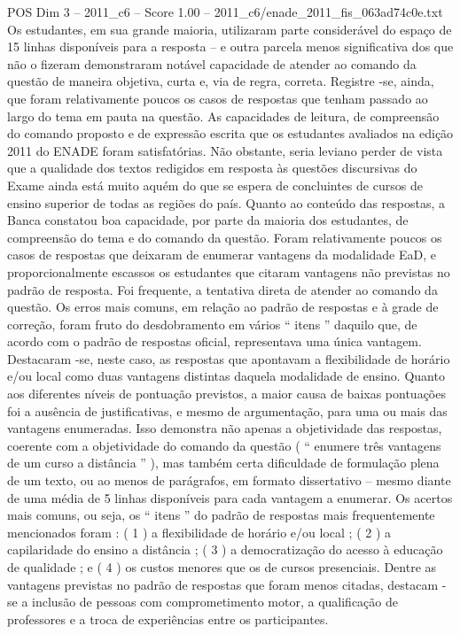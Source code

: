 \begin{textsample}{POS Dim 3 – 2011\_c6 – Score 1.00 – 2011\_c6/enade\_2011\_fis\_063ad74c0e.txt}
Os estudantes, em sua grande maioria, utilizaram parte considerável do espaço de 15 linhas disponíveis para a resposta – e outra parcela menos significativa dos que não o fizeram demonstraram notável capacidade de atender ao comando da questão de maneira objetiva, curta e, via de regra, correta.
Registre -se, ainda, que foram relativamente poucos os casos de respostas que tenham passado ao largo do tema em pauta na questão.
As capacidades de leitura, de compreensão do comando proposto e de expressão escrita que os estudantes avaliados na edição 2011 do ENADE foram satisfatórias.
Não obstante, seria leviano perder de vista que a qualidade dos textos redigidos em resposta às questões discursivas do Exame ainda está muito aquém do que se espera de concluintes de cursos de ensino superior de todas as regiões do país.
Quanto ao conteúdo das respostas, a Banca constatou boa capacidade, por parte da maioria dos estudantes, de compreensão do tema e do comando da questão.
Foram relativamente poucos os casos de respostas que deixaram de enumerar vantagens da modalidade EaD, e proporcionalmente escassos os estudantes que citaram vantagens não previstas no padrão de resposta.
Foi frequente, a tentativa direta de atender ao comando da questão.
Os erros mais comuns, em relação ao padrão de respostas e à grade de correção, foram fruto do desdobramento em vários “ itens ” daquilo que, de acordo com o padrão de respostas oficial, representava uma única vantagem.
Destacaram -se, neste caso, as respostas que apontavam a flexibilidade de horário e/ou local como duas vantagens distintas daquela modalidade de ensino.
Quanto aos diferentes níveis de pontuação previstos, a maior causa de baixas pontuações foi a ausência de justificativas, e mesmo de argumentação, para uma ou mais das vantagens enumeradas.
Isso demonstra não apenas a objetividade das respostas, coerente com a objetividade do comando da questão ( “ enumere três vantagens de um curso a distância ” ), mas também certa dificuldade de formulação plena de um texto, ou ao menos de parágrafos, em formato dissertativo – mesmo diante de uma média de 5 linhas disponíveis para cada vantagem a enumerar.
Os acertos mais comuns, ou seja, os “ itens ” do padrão de respostas mais frequentemente mencionados foram : ( 1 ) a flexibilidade de horário e/ou local ; ( 2 ) a capilaridade do ensino a distância ; ( 3 ) a democratização do acesso à educação de qualidade ; e ( 4 ) os custos menores que os de cursos presenciais.
Dentre as vantagens previstas no padrão de respostas que foram menos citadas, destacam -se a inclusão de pessoas com comprometimento motor, a qualificação de professores e a troca de experiências entre os participantes.

\end{textsample}
